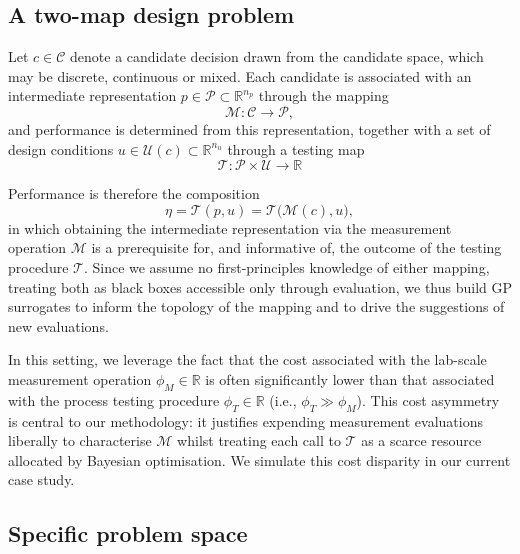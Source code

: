 \documentclass[preprint,12pt]{elsarticle}
\begin{document}
\subsection{A two-map design problem}
\label{sec:twomap}

Let $c \in \mathcal{C}$ denote a candidate decision drawn from the candidate space, which may be discrete, continuous or mixed. Each candidate is associated with an intermediate representation $p \in \mathcal{P} \subset \mathbb{R}^{n_p}$ through the mapping
\begin{equation}
    \mathcal{M} : \mathcal{C} \rightarrow \mathcal{P},
\end{equation}
and performance is determined from this representation, together with a set of design conditions $u \in \mathcal{U}(c) \subset \mathbb{R}^{n_u}$ through a testing map
\begin{equation}
    \mathcal{T} : \mathcal{P} \times\mathcal{U} \rightarrow \mathbb{R}
\end{equation}

Performance is therefore the composition
\begin{equation}
    \eta = \mathcal{T}(p, u) = \mathcal{T} \big(\mathcal{M}(c), u \big),
\end{equation}
in which obtaining the intermediate representation via the measurement operation $\mathcal{M}$ is a prerequisite for, and informative of, the outcome of the testing procedure $\mathcal{T}$. Since we assume no first-principles knowledge of either mapping, treating both as black boxes accessible only through evaluation, we thus build GP surrogates to inform the topology of the mapping and to drive the suggestions of new evaluations.

In this setting, we leverage the fact that the cost associated with the lab-scale measurement operation $\phi_M \in \mathbb{R}$ is often significantly lower than that associated with the process testing procedure $\phi_T \in \mathbb{R}$ (i.e., $\phi_T \gg \phi_M$). This cost asymmetry is central to our methodology: it justifies expending measurement evaluations liberally to characterise $\mathcal{M}$ whilst treating each call to $\mathcal{T}$ as a scarce resource allocated by Bayesian optimisation. We simulate this cost disparity in our current case study.

\subsection{Specific problem space}
\end{document}
